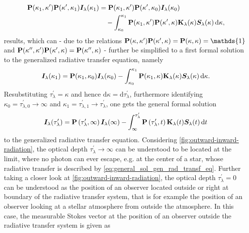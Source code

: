 \documentclass[a4paper,12pt]{report}
\begin{document}
\begin{align}
\begin{aligned}
\boldsymbol{\mathbf{P}}(\kappa_1,\kappa^\prime)\boldsymbol{\mathbf{P}}(\kappa^\prime,\kappa_1)\bm{I}_\lambda(\kappa_1) &= \boldsymbol{\mathbf{P}}(\kappa_1,\kappa^\prime)\boldsymbol{\mathbf{P}}(\kappa^\prime,\kappa_0)\bm{I}_\lambda(\kappa_0) \\
&\quad - \int_{\kappa_0}^{\kappa_1}\boldsymbol{\mathbf{P}}(\kappa_1,\kappa^\prime)\boldsymbol{\mathbf{P}}(\kappa^\prime,\kappa)\boldsymbol{\mathbf{K}}_\lambda(\kappa)\bm{S}_\lambda(\kappa)\,\mathrm{d}\kappa,
\end{aligned}
\end{align} results, which can - due to the relations $\matr{P}(\kappa,\kappa^\prime)\matr{P}(\kappa^\prime,\kappa) = \matr{P}(\kappa,\kappa) = \mathds{1}$ and $\boldsymbol{\mathbf{P}}(\kappa^{\prime\prime},\kappa^\prime)\boldsymbol{\mathbf{P}}(\kappa^\prime,\kappa) = \boldsymbol{\mathbf{P}}(\kappa^{\prime\prime},\kappa)$ - further be simplified to a first formal solution to the generalized radiative transfer equation, namely \begin{equation}
\bm{I}_\lambda(\kappa_1) = \boldsymbol{\mathbf{P}}(\kappa_1,\kappa_0)\bm{I}_\lambda(\kappa_0)- \int_{\kappa_0}^{\kappa_1}\boldsymbol{\mathbf{P}}(\kappa_1,\kappa)\boldsymbol{\mathbf{K}}_\lambda(\kappa)\bm{S}_\lambda(\kappa)\,\mathrm{d}\kappa.
\end{equation} Resubstituting $\tau_\lambda^\prime = \kappa$ and hence $\mathrm{d}\kappa = \mathrm{d}\tau_\lambda^\prime$, furthermore identifying $\kappa_0 = \tau_{\lambda,0}^\prime \rightarrow \infty$ and $\kappa_1 = \tau_{\lambda,1}^\prime\rightarrow \tau_\lambda^\prime$, one gets the general formal solution \begin{align}\begin{aligned}\label{eq:general_sol_gen_rad_transf_eq}
\bm{I}_\lambda(\tau_\lambda^\prime) = \boldsymbol{\mathbf{P}}\left(\tau_\lambda^\prime,\infty\right)\bm{I}_\lambda(\infty)  -\int_{\infty}^{\tau_\lambda^\prime}\boldsymbol{\mathbf{P}}\left(\tau_\lambda^\prime,t\right)\boldsymbol{\mathbf{K}}_\lambda(t)\bm{S}_\lambda(t)\,\mathrm{d}t
\end{aligned}\end{align} to the generalized radiative transfer equation. Considering \cref{fig:outward-inward-radiation}, the optical depth $\tau_\lambda^\prime \rightarrow \infty$ can be understood to be located at the limit, where no photon can ever escape, e.g. at the center of a star, whose radiative transfer is described by \cref{eq:general_sol_gen_rad_transf_eq}. Further taking a closer look at \cref{fig:outward-inward-radiation}, the optical depth $\tau_\lambda^\prime = 0$ can be understood as the position of an observer located outside or right at boundary of the radiative transfer system, that is for example the position of an observer looking at a stellar atmosphere from outside the atmosphere. In this case, the measurable Stokes vector at the position of an observer outside the radiative transfer system is given as \begin{align}\begin{aligned}\label{eq:special_sol_gen_rad_transf_eq}

\end{aligned}
\end{align}
\end{document}
